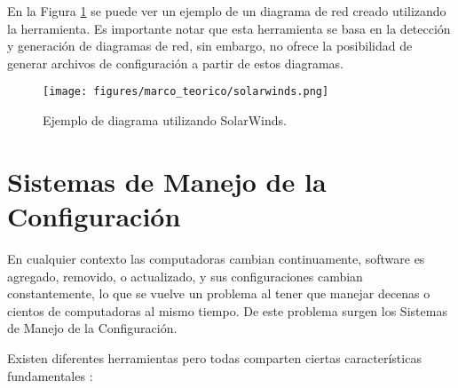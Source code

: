 En la Figura \ref{fig:marco:solarwinds} se puede ver un ejemplo de un diagrama de red creado utilizando la herramienta.
Es importante notar que esta herramienta se basa en la detección y generación de diagramas de red, sin embargo, no ofrece la posibilidad de generar archivos de configuración a partir de estos diagramas.

\begin{figure}[htbp]
    \centering
    \texttt{[image: figures/marco\_teorico/solarwinds.png]}
    \caption{Ejemplo de diagrama utilizando SolarWinds. \cite{solarwinds}}
    \label{fig:marco:solarwinds}
\end{figure}

\section{Sistemas de Manejo de la Configuración} \label{Sistemas de Manejo de la Configuracion}

En cualquier contexto las computadoras cambian continuamente, software es agregado, removido, o actualizado, y sus configuraciones cambian constantemente, lo que se vuelve un problema al tener que manejar decenas o cientos de computadoras al mismo tiempo. De este problema surgen los Sistemas de Manejo de la Configuración.

Existen diferentes herramientas pero todas comparten ciertas características fundamentales \cite{cotton2016what}:

